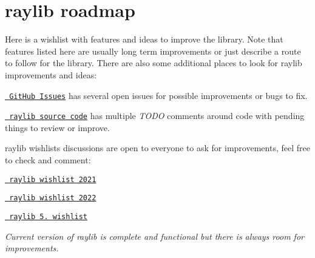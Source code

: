 \chapter{raylib roadmap}
\hypertarget{md__2home_2giangvu_2CPPprog_2raylib-tetris_2build_2external_2raylib-master_2ROADMAP}{}\label{md__2home_2giangvu_2CPPprog_2raylib-tetris_2build_2external_2raylib-master_2ROADMAP}
\label{md__2home_2giangvu_2CPPprog_2raylib-tetris_2build_2external_2raylib-master_2ROADMAP_autotoc_md97}%
%
 Here is a wishlist with features and ideas to improve the library. Note that features listed here are usually long term improvements or just describe a route to follow for the library. There are also some additional places to look for raylib improvements and ideas\+:


\begin{DoxyItemize}
\item \href{https://github.com/raysan5/raylib/issues}{\texttt{ Git\+Hub Issues}} has several open issues for possible improvements or bugs to fix.
\item \href{https://github.com/raysan5/raylib/tree/master/src}{\texttt{ raylib source code}} has multiple {\itshape TODO} comments around code with pending things to review or improve.
\item raylib wishlists discussions are open to everyone to ask for improvements, feel free to check and comment\+:
\begin{DoxyItemize}
\item \href{https://github.com/raysan5/raylib/discussions/1502}{\texttt{ raylib wishlist 2021}}
\item \href{https://github.com/raysan5/raylib/discussions/2272}{\texttt{ raylib wishlist 2022}}
\item \href{https://github.com/raysan5/raylib/discussions/2952}{\texttt{ raylib 5. wishlist}}
\end{DoxyItemize}
\end{DoxyItemize}

{\itshape Current version of raylib is complete and functional but there is always room for improvements.}

